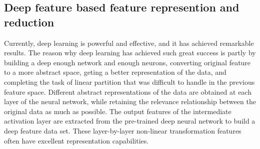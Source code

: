\documentclass{ieeeaccess}
\begin{document}
\subsection{Deep feature based feature represention and reduction}	

Currently, deep learning is powerful and effective, and it has achieved remarkable results. The reason why deep learning has achieved such great success is partly by building a deep enough network and enough neurons, converting original feature to a more abstract space, geting a better representation of the data, and completing the task of linear partition that was difficult to handle in the previous feature space.  Different abstract representations of the data are obtained at each layer of the neural network, while retaining the relevance relationship between the original data as much as possible. 
The output features of the intermediate activation layer are extracted from the pre-trained deep neural network to build a deep feature data set. These layer-by-layer non-linear transformation features often have excellent representation capabilities.
\end{document}
